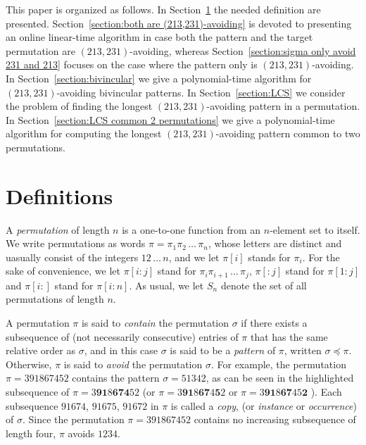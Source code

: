 \documentclass[a4paper]{llncs}
\DeclareMathOperator{\RED}{red}
\begin{document}
	This paper is organized as follows.
	In Section~\ref{section:Definitions} the needed definition are presented.
	Section~\ref{section:both are (213,231)-avoiding} is devoted to presenting
	an online linear-time algorithm in case both the pattern and the target
	permutation are $(213,231)$-avoiding,
	whereas Section~\ref{section:sigma only avoid 231 and 213} focuses on the case
	where the pattern only is $(213,231)$-avoiding.
	In Section~\ref{section:bivincular} we give a polynomial-time algorithm
	for $(213,231)$-avoiding bivincular patterns.
	In Section~\ref{section:LCS} we consider the problem of finding the longest
	$(213,231)$-avoiding pattern in a permutation.
	In Section~\ref{section:LCS common 2 permutations} we give a
	polynomial-time algorithm for computing the longest
	$(213,231)$-avoiding pattern common to two permutations.


\section{Definitions}
\label{section:Definitions}

A \emph{permutation} of length $n$ is a one-to-one function from an
$n$-element set to itself.
We write permutations as words
$\pi = \pi_1\pi_2\,\ldots\,\pi_n$, whose letters are distinct
and uasually consist of the integers $12\,\ldots\,n$, and we let
$\pi[i]$ stands for $\pi_i$.
For the sake of convenience, we let
$\pi[i:j]$ stand for
$\pi_i\pi_{i+1}\,\ldots\,\pi_j$,
$\pi[:j]$ stand for $\pi[1:j]$ and
$\pi[i:]$ stand for $\pi[i:n]$.
As usual, we let $S_n$ denote the set of all permutations of length $n$.


A permutation $\pi$ is said to \emph{contain} the permutation $\sigma$
if there exists a subsequence of (not necessarily consecutive)
entries of $\pi$ that has the same relative order as $\sigma$,
and in this case $\sigma$ is said to be a \emph{pattern} of
$\pi$, written $\sigma \preceq \pi$.
Otherwise, $\pi$ is said to \emph{avoid} the permutation $\sigma$.
For example, the permutation $\pi = 391867452$
contains the pattern $\sigma = 51342$,
as can be seen in the highlighted subsequence of
$\pi = 3\mathbf{9}\mathbf{1}8\mathbf{6}\mathbf{7}\mathbf{4}52$
(or
$\pi = 3\mathbf{9}\mathbf{1}8\mathbf{6}\mathbf{7}4\mathbf{5}2$
or
$\pi = 3\mathbf{9}\mathbf{1}8\mathbf{6}\mathbf{7}45\mathbf{2}$
).
Each subsequence $91674$,
$91675$,
$91672$ in $\pi$ is called a
\emph{copy},
(or \emph{instance} or \emph{occurrence}) of $\sigma$.
Since the permutation $\pi = 391867452$  contains no increasing subsequence of
length four, $\pi$ avoids $1234$.
\end{document}
